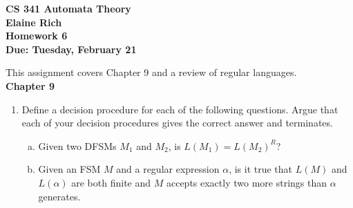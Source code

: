 \documentclass[10pt]{article}
\begin{document}
\begin{center}
\textbf{
CS 341 Automata Theory \\
Elaine Rich \\
Homework 6 \\
Due: Tuesday, February 21}\\
\end{center}
\noindent
This assignment covers Chapter 9 and a review of regular languages. \\

\noindent
\textbf{Chapter 9}
\begin{enumerate}[1)]

\item
Define a decision procedure for each of the following questions.  Argue that each of your decision procedures 
gives the correct answer and terminates.
\begin{enumerate}[a)]
\item
Given two DFSMs $M_1$ and $M_2$, is $L(M_1) = L(M_2)^R$?

\item
Given an FSM $M$ and a regular expression $\alpha$, is it true that $L(M)$ and $L(\alpha)$ are both finite and $M$ accepts exactly two more strings than $\alpha$ generates.
\end{enumerate}
\end{enumerate}
\end{document}
